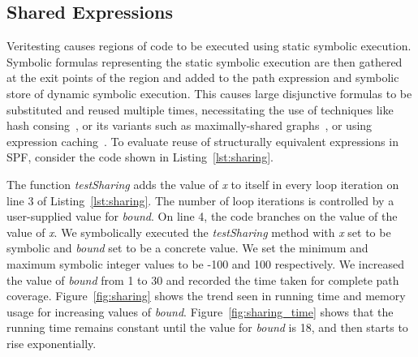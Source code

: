 \subsection{Shared Expressions}
Veritesting causes regions of code to be executed using static symbolic execution.
%
Symbolic formulas representing the static symbolic execution are then gathered at the exit points of the region and added to the path expression and symbolic store of dynamic symbolic execution.
%
This causes large disjunctive formulas to be substituted and reused multiple times, necessitating the use of techniques like hash consing~\cite{hashconsing}, or its variants such as maximally-shared graphs~\cite{babic}, or using expression caching~\cite{green}.
%
To evaluate reuse of structurally equivalent expressions in SPF, consider the code shown in Listing~\ref{lst:sharing}.
%

%
The function \textit{testSharing} adds the value of \textit{x} to itself in every loop iteration on line 3 of Listing~\ref{lst:sharing}.
%
The number of loop iterations is controlled by a user-supplied value for \textit{bound}.
%
On line 4, the code branches on the value of the value of \textit{x}.
%
We symbolically executed the \textit{testSharing} method with \textit{x} set to be symbolic and \textit{bound} set to be a concrete value.
%
We set the minimum and maximum symbolic integer values to be -100 and 100 respectively.
%
We increased the value of \textit{bound} from 1 to 30 and recorded the time taken for complete path coverage.
%
Figure~\ref{fig:sharing} shows the trend seen in running time and memory
usage for increasing values of \textit{bound}.
%
Figure~\ref{fig:sharing_time} shows that the running time remains constant until the value for \textit{bound} is 18, and then starts to rise exponentially.
%
%
